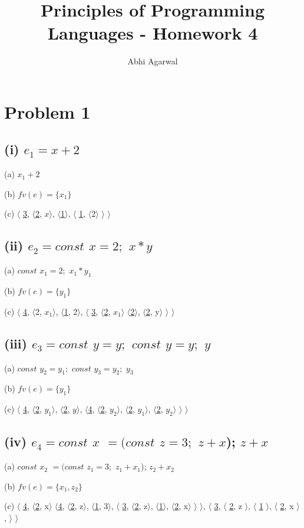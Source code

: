 \documentclass[11pt, oneside]{article}
\title{Principles of Programming Languages - Homework 4}
\author{Abhi Agarwal}
\date{}
\newcommand{\forceindent}{\leavevmode{\parindent=1.5em\indent}}
\begin{document}
\maketitle
\section{Problem 1}
\subsection*{(i) $e_1 = x + 2$}
\forceindent \par (a) $x_1 + 2$
\par (b) $fv (e) = \{x_1\}$
\par (c)
	$\langle$
		\uline{3},
		$\langle$\uline{2}, $x$$\rangle$,
		$\langle$\uline{1}$\rangle$,
		$\langle$
			\uline{1},
			$\langle$2$\rangle$
		$\rangle$
	$\rangle$

\subsection*{(ii) $e_2 = const$ $x = 2;$ $ x * y$}
\forceindent \par (a) $const$ $x_1 = 2;$ $ x_1 * y_1$
\par (b) $fv (e) = \{y_1\}$
\par (c)
	$\langle$
		\uline{4},
		$\langle$2, $x_1$$\rangle$,
		$\langle$\uline{1}, 2$\rangle$,
		$\langle$
			\uline{3},
			$\langle$\uline{2}, $x_1$$\rangle$
			$\langle$\uline{2}$\rangle$,
			$\langle$\uline{2}, y$\rangle$
		$\rangle$
	$\rangle$

\subsection*{(iii) $e_3 = const$ $y = y;$ $const$ $y = y;$ $y$}
\forceindent \par (a) $const$ $y_2 = y_1;$ $const$ $y_3 = y_2;$ $y_3$
\par (b) $fv (e) = \{y_1\}$
\par (c)
	$\langle$ 
		\uline{4},
		$\langle$\uline{2}, $y_1$$\rangle$,
		$\langle$\uline{2}, $y$$\rangle$,
		$\langle$\uline{4},
			$\langle$\uline{2}, $y_2$$\rangle$,
			$\langle$\uline{2}, $y_1$$\rangle$,
			$\langle$\uline{2}, $y_2$$\rangle$
		$\rangle$
	$\rangle$

\subsection*{(iv) $e_4 = const$ $x$ $= (const$ $z= 3;$ $z + x$); $z + x$}
\forceindent \par (a) $const$ $x_2$ $= (const$ $z_1 = 3;$ $z_1 + x_1$); $z_2 + x_2$
\par (b) $fv (e) = \{x_1, z_2\}$
\par (c)
	$\langle$
		\uline{4},
		$\langle$\uline{2}, x$\rangle$
		$\langle$\uline{4}, 
			$\langle$\uline{2}, z$\rangle$,
			$\langle$\uline{1}, 3$\rangle$,
			$\langle$
				\uline{3}, 
				$\langle$\uline{2}, z$\rangle$,
				$\langle$\uline{1}$\rangle$,
				$\langle$\uline{2}, x$\rangle$
			$\rangle$
		$\rangle$,
		$\langle$
			\uline{3},
			$\langle$
				\uline{2}, z
			$\rangle$,
			$\langle$
				\uline{1}
			$\rangle$,
			$\langle$
				\uline{2}, x
			$\rangle$,
		$\rangle$
	$\rangle$
\end{document}
